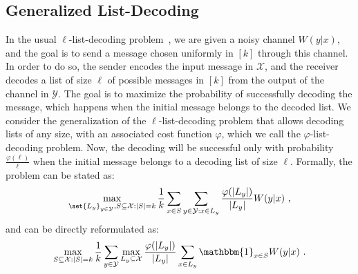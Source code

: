 \subsection{Generalized List-Decoding}
\label{subsection:generalized-list-decoding}
In the usual $\ell$-list-decoding problem~\cite{Elias57,Wozencraft58}, we are given a noisy channel $W(y|x)$, and the goal is to send a message chosen uniformly in $[k]$ through this channel. In order to do so, the sender encodes the input message in $\mathcal{X}$, and the receiver decodes a list of size $\ell$ of possible messages in $[k]$ from the output of the channel in $\mathcal{Y}$. The goal is to maximize the probability of successfully decoding the message, which happens when the initial message belongs to the decoded list. We consider the generalization of the $\ell$-list-decoding problem that allows decoding lists of any size, with an associated cost function $\varphi$, which we call the $\varphi$-list-decoding problem. Now, the decoding will be successful only with probability $\frac{\varphi(\ell)}{\ell}$ when the initial message belongs to a decoding list of size $\ell$. Formally, the problem can be stated as:
\[ \max_{\set{L_y}_{y \in \mathcal{Y}}, S \subseteq \mathcal{X}:|S|=k} \frac{1}{k}\sum_{x \in S}\sum_{y \in \mathcal{Y}: x \in L_y} \frac{\varphi(|L_y|)}{|L_y|}W(y|x)\ ,\]
and can be directly reformulated as:
\[ \max_{S \subseteq \mathcal{X}:|S|=k} \frac{1}{k}\sum_{y \in \mathcal{Y}} \max_{L_y \subseteq \mathcal{X}} \frac{\varphi(|L_y|)}{|L_y|} \sum_{x \in L_y}\mathbbm{1}_{x \in S}W(y|x) \ .\]

